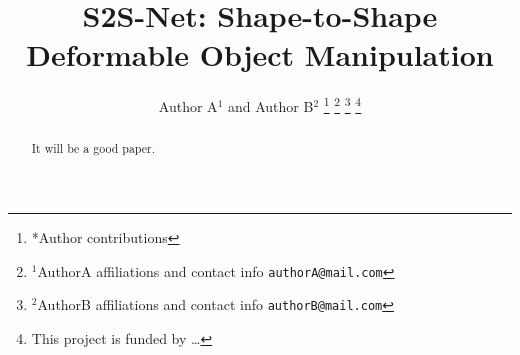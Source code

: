 \documentclass[letterpaper, 10 pt, conference, onecolumn]{IEEEtran}
\begin{document}
\title{\LARGE \bf S2S-Net: Shape-to-Shape Deformable Object Manipulation}
\author{Author A$^{1}$ and Author B$^{2}$
    \thanks{*Author contributions}
    \thanks{$^{1}$AuthorA affiliations and contact info
            {\tt\small authorA@mail.com}
    }
    \thanks{$^{2}$AuthorB affiliations and contact info
            {\tt\small authorB@mail.com}
    }
    \thanks{This project is funded by \dots}
}
\maketitle

\begin{abstract}
    It will be a good paper.
\end{abstract}




\end{document}
